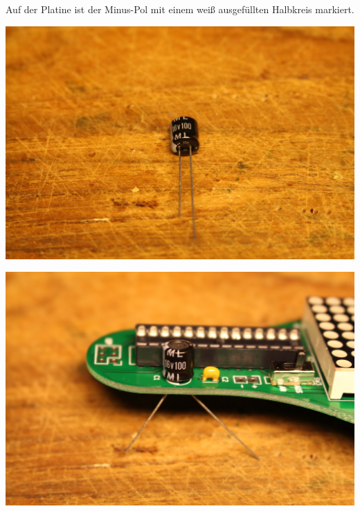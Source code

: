 \documentclass{article}
\begin{document}
Auf der Platine ist der Minus-Pol mit einem weiß ausgefüllten Halbkreis markiert.

\vspace{1cm}

\begin{minipage}[b]{0.5\textwidth}
	\includegraphics[width=\textwidth]{Bilder2021/IMG_8162.JPG}
\end{minipage}
\begin{minipage}[b]{0.5\textwidth}
	\includegraphics[width=\textwidth]{Bilder2021/IMG_8163.JPG}
\end{minipage}

\vspace{0.5cm}
\end{document}
